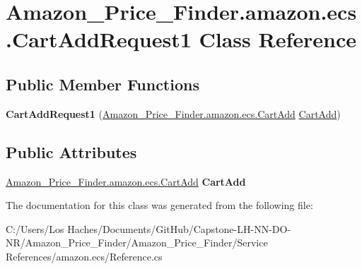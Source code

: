 \hypertarget{class_amazon___price___finder_1_1amazon_1_1ecs_1_1_cart_add_request1}{\section{Amazon\-\_\-\-Price\-\_\-\-Finder.\-amazon.\-ecs.\-Cart\-Add\-Request1 Class Reference}
\label{class_amazon___price___finder_1_1amazon_1_1ecs_1_1_cart_add_request1}
}
\subsection*{Public Member Functions}
\begin{DoxyCompactItemize}
\item 
\hypertarget{class_amazon___price___finder_1_1amazon_1_1ecs_1_1_cart_add_request1_a43097234cf552fb4ffaba74809e1acf5}{{\bfseries Cart\-Add\-Request1} (\hyperlink{class_amazon___price___finder_1_1amazon_1_1ecs_1_1_cart_add}{Amazon\-\_\-\-Price\-\_\-\-Finder.\-amazon.\-ecs.\-Cart\-Add} \hyperlink{class_amazon___price___finder_1_1amazon_1_1ecs_1_1_cart_add}{Cart\-Add})}\label{class_amazon___price___finder_1_1amazon_1_1ecs_1_1_cart_add_request1_a43097234cf552fb4ffaba74809e1acf5}

\end{DoxyCompactItemize}
\subsection*{Public Attributes}
\begin{DoxyCompactItemize}
\item 
\hypertarget{class_amazon___price___finder_1_1amazon_1_1ecs_1_1_cart_add_request1_aad801b5d793b42c6dd35dfd25ab37d4b}{\hyperlink{class_amazon___price___finder_1_1amazon_1_1ecs_1_1_cart_add}{Amazon\-\_\-\-Price\-\_\-\-Finder.\-amazon.\-ecs.\-Cart\-Add} {\bfseries Cart\-Add}}\label{class_amazon___price___finder_1_1amazon_1_1ecs_1_1_cart_add_request1_aad801b5d793b42c6dd35dfd25ab37d4b}

\end{DoxyCompactItemize}


The documentation for this class was generated from the following file\-:\begin{DoxyCompactItemize}
\item 
C\-:/\-Users/\-Los Haches/\-Documents/\-Git\-Hub/\-Capstone-\/\-L\-H-\/\-N\-N-\/\-D\-O-\/\-N\-R/\-Amazon\-\_\-\-Price\-\_\-\-Finder/\-Amazon\-\_\-\-Price\-\_\-\-Finder/\-Service References/amazon.\-ecs/Reference.\-cs\end{DoxyCompactItemize}
